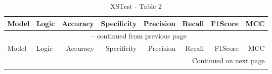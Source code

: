 \documentclass{article}
\begin{document}

{\small
\begin{longtable}{llrrrrrr}
\caption{XSTest - Table 2} \label{tab:5models} \\
 
\toprule
Model & Logic & Accuracy & Specificity & Precision & Recall & F1Score & MCC \\
\midrule
\endfirsthead
 
\multicolumn{8}{c}{\tablename\ \thetable{} -- continued from previous page} \\
\toprule
Model & Logic & Accuracy & Specificity & Precision & Recall & F1Score & MCC \\
\midrule
\endhead
 
\midrule
\multicolumn{8}{r}{Continued on next page} \\
\endfoot
 
\bottomrule
\endlastfoot


\end{longtable}}
\end{document}
